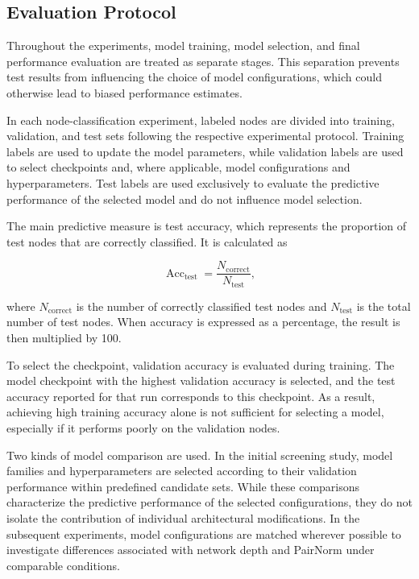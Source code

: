 \documentclass[english]{lni}
\begin{document}
\subsection{Evaluation Protocol}
\label{sec:evaluation-protocol}

Throughout the experiments, model training, model selection, and final performance evaluation are treated as separate stages. This separation prevents test results from influencing the choice of model configurations, which could otherwise lead to biased performance estimates.

In each node-classification experiment, labeled nodes are divided into training, validation, and test sets following the respective experimental protocol. Training labels are used to update the model parameters, while validation labels are used to select checkpoints and, where applicable, model configurations and hyperparameters. Test labels are used exclusively to evaluate the predictive performance of the selected model and do not influence model selection.

The main predictive measure is test accuracy, which represents the proportion of test nodes that are correctly classified. It is calculated as

\begin{equation}
\operatorname{Acc}_{\mathrm{test}}
=
\frac{N_{\mathrm{correct}}}{N_{\mathrm{test}}},
\label{eq:test-accuracy}
\end{equation}

where $N_{\mathrm{correct}}$ is the number of correctly classified test nodes and $N_{\mathrm{test}}$ is the total number of test nodes. When accuracy is expressed as a percentage, the result is then multiplied by 100.

To select the checkpoint, validation accuracy is evaluated during training. The model checkpoint with the highest validation accuracy is selected, and the test accuracy reported for that run corresponds to this checkpoint. As a result, achieving high training accuracy alone is not sufficient for selecting a model, especially if it performs poorly on the validation nodes.

Two kinds of model comparison are used. In the initial screening study, model families and hyperparameters are selected according to their validation performance within predefined candidate sets. While these comparisons characterize the predictive performance of the selected configurations, they do not isolate the contribution of individual architectural modifications. In the subsequent experiments, model configurations are matched wherever possible to investigate differences associated with network depth and PairNorm under comparable conditions.
\end{document}

